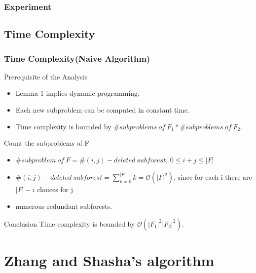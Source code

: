 \documentclass{beamer}
\begin{document}
\begin{frame}
\frametitle{Experiment}

\end{frame}
\subsection{Time Complexity}
\begin{frame}
\frametitle{Time Complexity(Naive Algorithm)}
\begin{block}{Prerequisite of the Analysis}
\begin{itemize}
\item Lemma 1 implies dynamic programming.
\item Each new subproblem can be computed in constant time.
\item Time complexity is bounded by $\#subproblems\ of\ F_1 * \#subproblems\ of\ F_2$. 
\end{itemize}
\end{block}
\begin{block}{Count the subproblems of F}
\begin{itemize}
\item  $\#subproblem\ of\ F = \#(i,j)-deleted\ subforest$, $0 \leq i + j \leq \left\vert F \right\vert$ 
\item $\#(i, j)-deleted\ subforest = \sum_{k=0}^{\left\vert F \right\vert}k = \mathcal{O}(\left\vert F \right\vert^2)$, since for each i there are $\left\vert F \right\vert - i$ choices for j
\item numerous redundant subforests.
\end{itemize}
\end{block}
\begin{block}{Conclusion}
Time complexity is bounded by $\mathcal{O}(\left\vert F_1 \right\vert^2 \left\vert F_2 \right\vert^2)$. 
\end{block}
\end{frame}
\section{Zhang and Shasha's algorithm}
\end{document}
